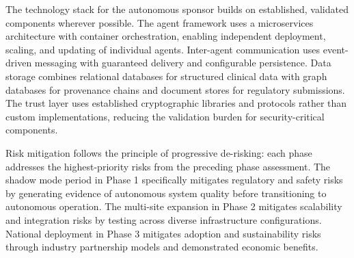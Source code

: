 The technology stack for the autonomous sponsor builds on established, validated components
wherever possible. The agent framework uses a microservices architecture with container
orchestration, enabling independent deployment, scaling, and updating of individual agents.
Inter-agent communication uses event-driven messaging with guaranteed delivery and
configurable persistence. Data storage combines relational databases for structured clinical
data with graph databases for provenance chains and document stores for regulatory
submissions. The trust layer uses established cryptographic libraries and protocols rather
than custom implementations, reducing the validation burden for security-critical components.

Risk mitigation follows the principle of progressive de-risking: each phase addresses the
highest-priority risks from the preceding phase assessment. The shadow mode period in
Phase 1 specifically mitigates regulatory and safety risks by generating evidence of
autonomous system quality before transitioning to autonomous operation. The multi-site
expansion in Phase 2 mitigates scalability and integration risks by testing across diverse
infrastructure configurations. National deployment in Phase 3 mitigates adoption and
sustainability risks through industry partnership models and demonstrated economic benefits.
